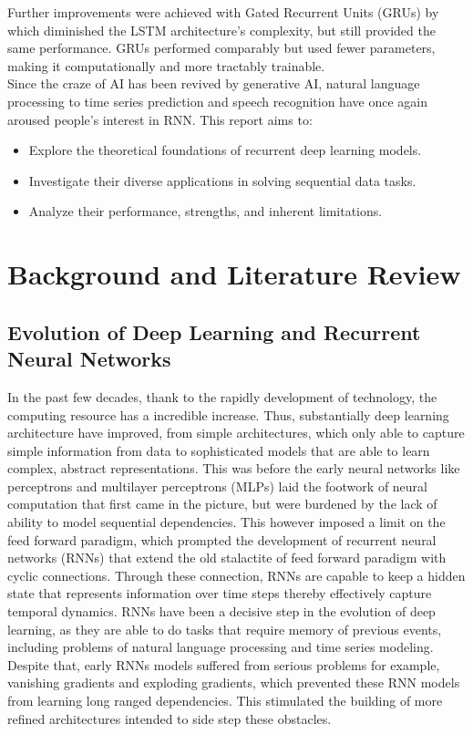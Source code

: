 \documentclass[12pt,a4paper]{article}
\begin{document}
Further improvements were achieved with Gated Recurrent Units (GRUs) by \parencite{cho2014properties} which diminished the LSTM architecture's complexity, but still provided the same performance. GRUs performed comparably but used fewer parameters, making it computationally and more tractably trainable.\\[1ex]
Since the craze of AI has been revived by generative AI, natural language processing to time series prediction and speech recognition have once again aroused people's interest in RNN. This report aims to:
\begin{itemize}
    \item Explore the theoretical foundations of recurrent deep learning models.
    \item Investigate their diverse applications in solving sequential data tasks.
    \item Analyze their performance, strengths, and inherent limitations.
\end{itemize}
\newpage
\section{Background and Literature Review}
\subsection{Evolution of Deep Learning and Recurrent Neural Networks}
In the past few decades, thank to the rapidly development of technology, the computing resource has a incredible increase. Thus, substantially deep learning architecture have improved, from simple architectures, which only able to capture simple information from data to sophisticated models that are able to learn complex, abstract representations. This was before the early neural networks like perceptrons and multilayer perceptrons (MLPs) laid the footwork of neural computation that first came in the picture, but were burdened by the lack of ability to model sequential dependencies. This however imposed a limit on the feed forward paradigm, which prompted the development of recurrent neural networks (RNNs) that extend the old stalactite of feed forward paradigm with cyclic connections. Through these connection, RNNs are capable to keep a hidden state that represents information over time steps thereby effectively capture temporal dynamics. RNNs have been a decisive step in the evolution of deep learning, as they are able to do tasks that require memory of previous events, including problems of natural language processing and time series modeling. Despite that, early RNNs models suffered from serious problems for example,  vanishing gradients and exploding gradients, which prevented these RNN models from learning long ranged dependencies. This stimulated the building of more refined architectures intended to side step these obstacles.
\end{document}

